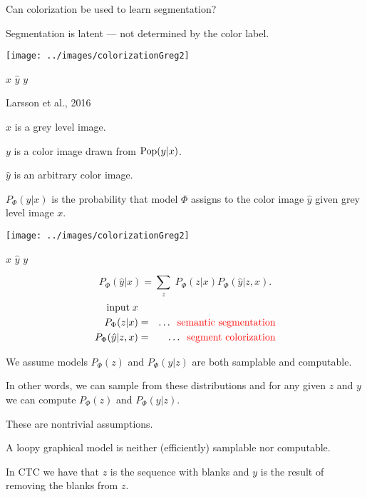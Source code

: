 {\vfill
Can colorization be used to learn segmentation?

\vfill
Segmentation is latent --- not determined by the color label.

\medskip
\centerline{\texttt{[image: ../images/colorizationGreg2]}}
\centerline{$x$ \hspace{4em} $\hat{y}$ \hspace{4em} $y$}
\centerline{\huge Larsson et al., 2016}

\vfill
$x$ is a grey level image.

\vfill
$y$ is a color image drawn from $\mathrm{Pop}(y|x)$.

\vfill
$\hat{y}$ is an arbitrary color image.

\vfill
$P_\Phi(\hat{y}|x)$ is the probability that model $\Phi$ assigns to the color image $\hat{y}$ given grey level image $x$.

\medskip
\centerline{\texttt{[image: ../images/colorizationGreg2]}}
\centerline{$x$ \hspace{4em} $\hat{y}$ \hspace{4em} $y$}

\vfill
{\color{red} $$P_\Phi(\hat{y}|x) = \sum_z\;P_\Phi(z|x)P_\Phi(\hat{y}|z,x).$$}
\begin{eqnarray*}
\mbox{input}\; x \\
P_\Phi(z|x) & = & \ldots \;\;\mbox{\color{red} semantic segmentation} \\
P_\Phi(\hat{y}|z,x) & = & \ldots \;\;\mbox{\color{red} segment colorization} \\
\end{eqnarray*}


\bigskip
\bigskip
We assume models $P_\Phi(z)$ and $P_\Phi(y|z)$ are both samplable and computable.

\vfill
In other words, we can sample from these distributions and for any given $z$ and $y$ we can compute $P_\Phi(z)$ and $P_\Phi(y|z)$.

\vfill
These are nontrivial assumptions.

\vfill
A loopy graphical model is neither (efficiently) samplable nor computable.


In CTC we have that $z$ is the sequence with blanks and $y$ is the result of removing the blanks from $z$.

}
